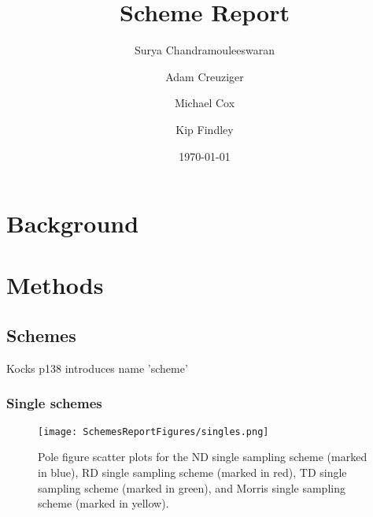 \documentclass{article}
\begin{document}
\title{Scheme Report} %
\date{\today}
\author[1, 2]{Surya Chandramouleeswaran}
\author[3]{Adam Creuziger}
\author[2]{Michael Cox}
\author[2]{Kip Findley}


\maketitle

\section{Background}


\section{Methods}






\subsection{Schemes}


Kocks p138 introduces name 'scheme'



\subsubsection{Single schemes}
\begin{figure}[ht]
    \centering
    \texttt{[image: SchemesReportFigures/singles.png]}
    \caption{Pole figure scatter plots for the ND single sampling scheme (marked in blue), RD single sampling scheme (marked in red), TD single sampling scheme (marked in green), and Morris single sampling scheme (marked in yellow).}
\end{figure}
\end{document}
